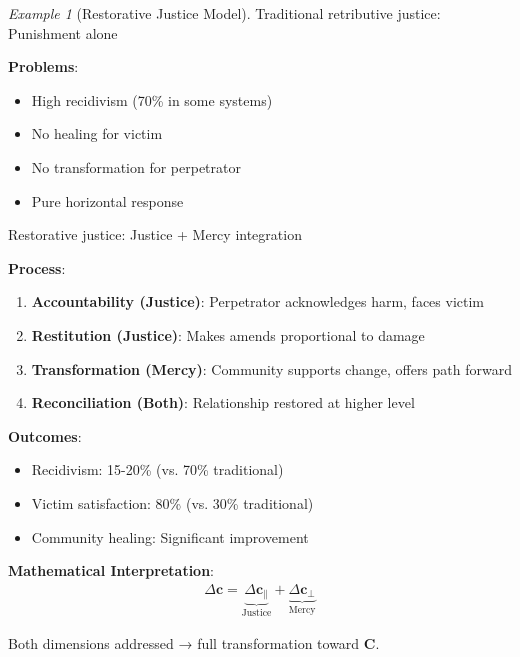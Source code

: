 \documentclass[11pt,a4paper]{article}
\theoremstyle{definition}
\theoremstyle{remark}
\newtheorem{example}{Example}[section]
\newcommand{\cc}{\mathbf{c}}
\begin{document}
\begin{small}
\begin{enumerate}
\begin{example}[Restorative Justice Model]
Traditional retributive justice: Punishment alone

\textbf{Problems}:
\begin{itemize}
    \item High recidivism (70\% in some systems)
    \item No healing for victim
    \item No transformation for perpetrator
    \item Pure horizontal response
\end{itemize}

Restorative justice: Justice + Mercy integration

\textbf{Process}:
\begin{enumerate}
    \item \textbf{Accountability (Justice)}: Perpetrator acknowledges harm, faces victim
    \item \textbf{Restitution (Justice)}: Makes amends proportional to damage
    \item \textbf{Transformation (Mercy)}: Community supports change, offers path forward
    \item \textbf{Reconciliation (Both)}: Relationship restored at higher level
\end{enumerate}

\textbf{Outcomes}:
\begin{itemize}
    \item Recidivism: 15-20\% (vs. 70\% traditional)
    \item Victim satisfaction: 80\% (vs. 30\% traditional)
    \item Community healing: Significant improvement
\end{itemize}

\textbf{Mathematical Interpretation}:
\begin{align}
\Delta \cc = \underbrace{\Delta \cc_{\parallel}}_{\text{Justice}} + \underbrace{\Delta \cc_{\perp}}_{\text{Mercy}}
\end{align}

Both dimensions addressed → full transformation toward \(\mathbf{C}\).
\end{example}

\begin{figure}[H]
\centering
{}
\end{figure}
\end{enumerate}
\end{small}
\end{document}
